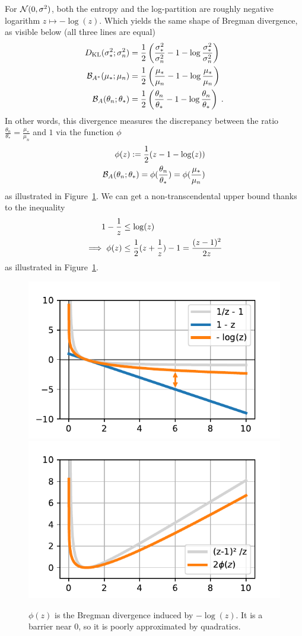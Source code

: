 \documentclass{article}
\newcommand{\logpart}{A}
\newcommand{\bregman}{\cB_\logpart}
\newcommand{\bregmanconj}{\cB_{\logpart^*}}
\newcommand{\natp}{\theta}
\begin{document}
\begin{example}
	For ${\mathcal N}(0,\sigma^2)$, both the entropy and the log-partition are roughly negative logarithm $z\mapsto - \log(z)$. Which yields the same shape of Bregman divergence, as visible below (all three lines are equal)
\begin{align}
	\KL( \sigma_*^2 ; \sigma_n^2 ) 
	&= \half \left ( \frac{\sigma_*^2}{ \sigma_n^2} - 1 - \log \frac{\sigma_*^2}{ \sigma_n^2} \right) \\
	\bregmanconj( \mu_*; \mu_n) 
	&= \half \left ( \frac{\mu_*}{ \mu_n} - 1 - \log  \frac{\mu_*}{ \mu_n} \right) \\
	\bregman( \natp_n; \natp_* ) 
	&=  \half \left ( \frac{ \natp_n}{\natp_*} - 1 - \log  \frac{ \natp_n}{\natp_*} \right) \; .
\end{align}
In other words, this divergence measures the discrepancy between the ratio $\frac{ \natp_n}{\natp_*} =  \frac{\mu_*}{ \mu_n}  $ and $1$ via the function $\phi$
\begin{align}
	\phi(z) := \half (z - 1 - \log(z)) \\
	\bregman( \natp_n; \natp_* )   = \phi(\frac{ \natp_n}{\natp_*}) =  \phi(\frac{\mu_*}{ \mu_n})
\end{align}
as illustrated in Figure~\ref{fig:phi}. We can get a non-transcendental upper bound thanks to the inequality
\begin{align}
	1 - \frac{1}{z} &\leq \log(z) 
	\label{eq:log_bound}\\
	\implies \phi(z) &\leq \frac{1}{2} (z + \frac{1}{z}) - 1 = \frac{(z-1)^2}{2 z}
\end{align}
as illustrated in Figure~\ref{fig:phi}.
\end{example}

\begin{figure}[ht]
	\centering
	\includegraphics[width=.4\textwidth]{figs/bregmandef.pdf}
	\includegraphics[width=.4\textwidth]{figs/phi.pdf}
	\caption{$\phi(z)$ is the Bregman divergence induced by $-\log(z)$. It is a barrier near $0$, so it is poorly approximated by quadratics.}
	\label{fig:phi}
\end{figure}
\end{document}

